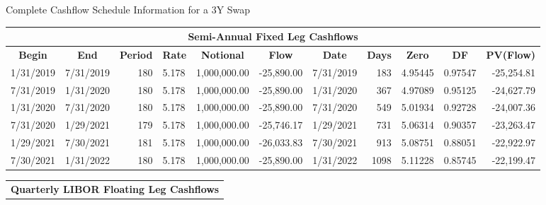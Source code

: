 \documentclass[handout, aspectratio=169]{beamer}
\begin{document}
\begin{frame}{Complete Cashflow Schedule Information for a 3Y Swap}
	\vspace{.2cm}
	\begin{table}[t]
		\centering
		\begin{adjustbox}{max width=.9\textwidth, max height=\textheight}
			\begin{tabular}{|r|r|r|l|r|r|r|r|l|l|r|} 
				\hline
				\multicolumn{11}{|c|}{\textbf{Semi-Annual Fixed Leg Cashflows}} \\
				\hline
				\multicolumn{1}{|c|}{\textbf{Begin}} & \multicolumn{1}{c|}{\textbf{End}} & \multicolumn{1}{c|}{\textbf{Period}} &
				\multicolumn{1}{|c|}{\textbf{Rate}} & \multicolumn{1}{|c|}{\textbf{Notional}} &
				\multicolumn{1}{|c|}{\textbf{Flow}} &\multicolumn{1}{|c|}{\textbf{Date}} &\multicolumn{1}{|c|}{\textbf{Days}} &
				\multicolumn{1}{|c|}{\textbf{Zero}} &\multicolumn{1}{|c|}{\textbf{DF}} &\multicolumn{1}{|c|}{\textbf{PV(Flow)}} \\
				\hline
				1/31/2019 & 7/31/2019 & 180 & 5.178 & 1,000,000.00 & -25,890.00 & 7/31/2019	& 183 & 4.95445 & 0.97547 & -25,254.81 \\
				7/31/2019 & 1/31/2020 & 180 & 5.178 & 1,000,000.00 & -25,890.00 & 1/31/2020 & 367 & 4.97089 & 0.95125 & -24,627.79 \\
				1/31/2020 & 7/31/2020 & 180 & 5.178 & 1,000,000.00 & -25,890.00 & 7/31/2020 & 549 & 5.01934 & 0.92728 & -24,007.36 \\
				7/31/2020 & 1/29/2021 & 179 & 5.178 & 1,000,000.00 & -25,746.17 & 1/29/2021 & 731 & 5.06314 & 0.90357 & -23,263.47 \\
				1/29/2021 & 7/30/2021 & 181 & 5.178 & 1,000,000.00 & -26,033.83 & 7/30/2021 & 913 & 5.08751 & 0.88051 & -22,922.97 \\
				7/30/2021 & 1/31/2022 & 180 & 5.178 & 1,000,000.00 & -25,890.00 & 1/31/2022 & 1098 & 5.11228 & 0.85745 & -22,199.47 \\
				\hline
			\end{tabular}
		\end{adjustbox}
	\end{table}
	\pause
	\begin{table}[t]
		\centering
		\begin{adjustbox}{max width=\textwidth, max height=\textheight}
			\begin{tabular}{|r|r|r|r|l|r|r|r|r|l|l|r|} 
				\hline
				\multicolumn{12}{|c|}{\textbf{Quarterly LIBOR Floating Leg Cashflows}} \\

\end{tabular}
\end{adjustbox}
\end{table}
\end{frame}
\end{document}
